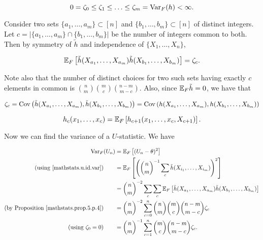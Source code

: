 \begin{proposition}

\[
0 = \zeta_0 \leq \zeta_1 \leq \ldots \leq \zeta_m = \Var_F(h) < \infty.
\]

\end{proposition}

\begin{proposition}\label{mathstats.prop.5.p.4}

Consider two sets \(\{a_1, \ldots, a_m\} \subset [n]\) and \(\{b_1, \ldots, b_m\} \subset [n]\) of distinct integers. Let \(c = \left|\{a_1, \ldots, a_m\} \cap \{b_1, \ldots, b_m\}  \right| \) be the number of integers common to both. Then by symmetry of \(\tilde{h}\) and independence of \(\{X_1, \ldots, X_n\}\),

\[
\E_F \left[ \tilde{h}(X_{a_1}, \ldots, X_{a_m}) \tilde{h}(X_{b_1}, \ldots, X_{b_m})  \right] = \zeta_c.
\]

\end{proposition}

\begin{remark}

Note also that the number of distinct choices for two such sets having exactly \(c\) elements in common is \(\binom{n}{m} \binom{m}{c} \binom{n-m}{m-c}\). Also, since \(\E_F \tilde{h} = 0\), we have that

\[
\zeta_c = \Cov \left( \tilde{h}(X_{a_1}, \ldots, X_{a_m}), \tilde{h}(X_{b_1}, \ldots, X_{b_m}) \right) 
 = \Cov \left( h(X_{a_1}, \ldots, X_{a_m}), h(X_{b_1}, \ldots, X_{b_m}) \right)
\]

\[
h_c(x_1, \ldots, x_c) = \E_F\left[ h_{c+1}(x_1, \ldots, x_c, X_{c+1}) \right].
\]

\end{remark}

Now we can find the variance of a \(U\)-statistic. We have

\begin{align}
\Var_F(U_n) & = \E_F \left[ (U_n - \theta)^2\right] \nonumber
\\ \text{(using \eqref{mathstats.u.id.var})} \qquad & = \E_F \left[ \left(  \binom{n}{m}^{-1} \sum_c \tilde{h}(X_{i_1}, \ldots, X_{i_m}) \right)^2\right]  \nonumber
\\ & =  \binom{n}{m}^{-2}  \sum_c  \sum_c \E_F \left[ \tilde{h}(X_{a_1}, \ldots, X_{a_m}) \tilde{h}(X_{b_1}, \ldots, X_{b_m}) \right]  \nonumber
\\ \text{(by Proposition \ref{mathstats.prop.5.p.4})} \qquad & =  \binom{n}{m}^{-2}  \sum_{c=0}^n \binom{n}{m} \binom{m}{c} \binom{n-m}{m-c} \zeta_c   \nonumber
\\ \text{(using \(\zeta_0 = 0\))} \qquad & =  \binom{n}{m}^{-1}  \sum_{c=1}^n \binom{m}{c} \binom{n-m}{m-c} \zeta_c . \label{mathstats.u.var}
\end{align}



